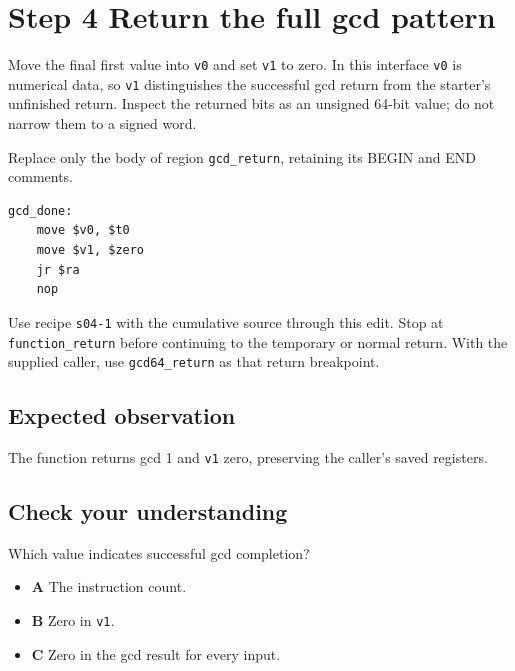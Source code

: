 \section{Step 4 Return the full gcd pattern}\label{rsa-s04}

Move the final first value into \texttt{v0} and set \texttt{v1} to zero. In this interface \texttt{v0} is numerical data, so \texttt{v1} distinguishes the successful gcd return from the starter's unfinished return. Inspect the returned bits as an unsigned 64-bit value; do not narrow them to a signed word.

Replace only the body of region \texttt{gcd\_return}, retaining its BEGIN and END comments.

\begin{verbatim}
gcd_done:
    move $v0, $t0
    move $v1, $zero
    jr $ra
    nop
\end{verbatim}

Use recipe \texttt{s04-1} with the cumulative source through this edit. Stop at \texttt{function\_return} before continuing to the temporary or normal return. With the supplied caller, use \texttt{gcd64\_return} as that return breakpoint.

\subsection{Expected observation}
The function returns gcd 1 and \texttt{v1} zero, preserving the caller's saved registers.

\subsection{Check your understanding}
Which value indicates successful gcd completion?

\begin{itemize}
\item \textbf{A} The instruction count.
\item \textbf{B} Zero in \texttt{v1}.
\item \textbf{C} Zero in the gcd result for every input.
\end{itemize}
